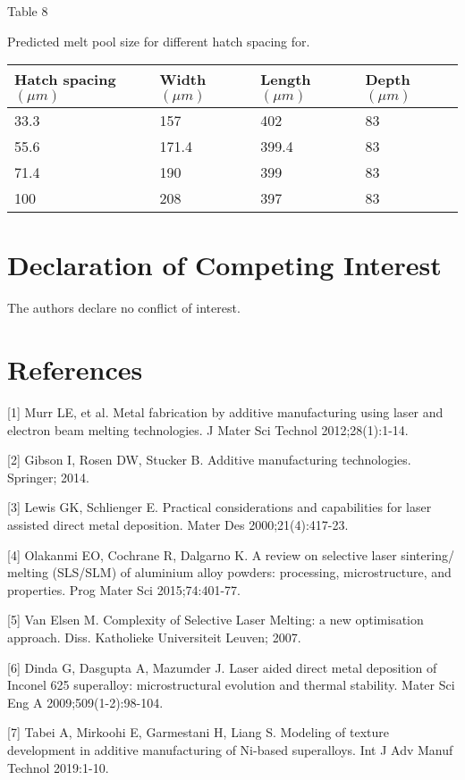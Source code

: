 \documentclass[10pt]{article}
\begin{document}
Table 8

Predicted melt pool size for different hatch spacing for.

\begin{center}
\begin{tabular}{llll}
\hline
Hatch spacing $(\mu m)$ & Width $(\mu m)$ & Length $(\mu m)$ & Depth $(\mu m)$ \\
\hline
33.3 & 157 & 402 & 83 \\
55.6 & 171.4 & 399.4 & 83 \\
71.4 & 190 & 399 & 83 \\
100 & 208 & 397 & 83 \\
\hline
\end{tabular}
\end{center}

\section*{Declaration of Competing Interest}
The authors declare no conflict of interest.

\section*{References}
[1] Murr LE, et al. Metal fabrication by additive manufacturing using laser and electron beam melting technologies. J Mater Sci Technol 2012;28(1):1-14.

[2] Gibson I, Rosen DW, Stucker B. Additive manufacturing technologies. Springer; 2014.

[3] Lewis GK, Schlienger E. Practical considerations and capabilities for laser assisted direct metal deposition. Mater Des 2000;21(4):417-23.

[4] Olakanmi EO, Cochrane R, Dalgarno K. A review on selective laser sintering/ melting (SLS/SLM) of aluminium alloy powders: processing, microstructure, and properties. Prog Mater Sci 2015;74:401-77.

[5] Van Elsen M. Complexity of Selective Laser Melting: a new optimisation approach. Diss. Katholieke Universiteit Leuven; 2007.

[6] Dinda G, Dasgupta A, Mazumder J. Laser aided direct metal deposition of Inconel 625 superalloy: microstructural evolution and thermal stability. Mater Sci Eng A 2009;509(1-2):98-104.

[7] Tabei A, Mirkoohi E, Garmestani H, Liang S. Modeling of texture development in additive manufacturing of Ni-based superalloys. Int J Adv Manuf Technol 2019:1-10.
\end{document}
